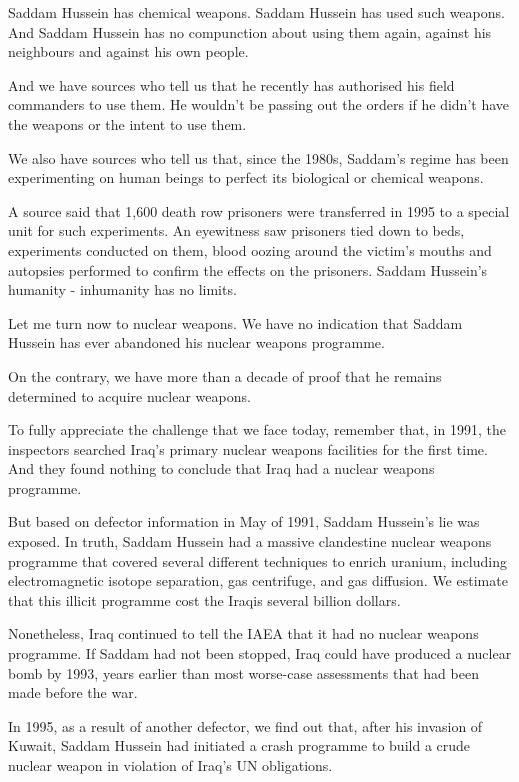 \documentclass[10pt,a4paper]{article}
\begin{document}
Saddam Hussein has chemical weapons. Saddam Hussein has used such weapons. And Saddam Hussein has no compunction about using them again, against his neighbours and against his own people.

And we have sources who tell us that he recently has authorised his field commanders to use them. He wouldn't be passing out the orders if he didn't have the weapons or the intent to use them.

We also have sources who tell us that, since the 1980s, Saddam's regime has been experimenting on human beings to perfect its biological or chemical weapons.

A source said that 1,600 death row prisoners were transferred in 1995 to a special unit for such experiments. An eyewitness saw prisoners tied down to beds, experiments conducted on them, blood oozing around the victim's mouths and autopsies performed to confirm the effects on the prisoners. Saddam Hussein's humanity - inhumanity has no limits.

Let me turn now to nuclear weapons. We have no indication that Saddam Hussein has ever abandoned his nuclear weapons programme.

On the contrary, we have more than a decade of proof that he remains determined to acquire nuclear weapons.

To fully appreciate the challenge that we face today, remember that, in 1991, the inspectors searched Iraq's primary nuclear weapons facilities for the first time. And they found nothing to conclude that Iraq had a nuclear weapons programme.

But based on defector information in May of 1991, Saddam Hussein's lie was exposed. In truth, Saddam Hussein had a massive clandestine nuclear weapons programme that covered several different techniques to enrich uranium, including electromagnetic isotope separation, gas centrifuge, and gas diffusion. We estimate that this illicit programme cost the Iraqis several billion dollars.

Nonetheless, Iraq continued to tell the IAEA that it had no nuclear weapons programme. If Saddam had not been stopped, Iraq could have produced a nuclear bomb by 1993, years earlier than most worse-case assessments that had been made before the war.

In 1995, as a result of another defector, we find out that, after his invasion of Kuwait, Saddam Hussein had initiated a crash programme to build a crude nuclear weapon in violation of Iraq's UN obligations.
\end{document}
